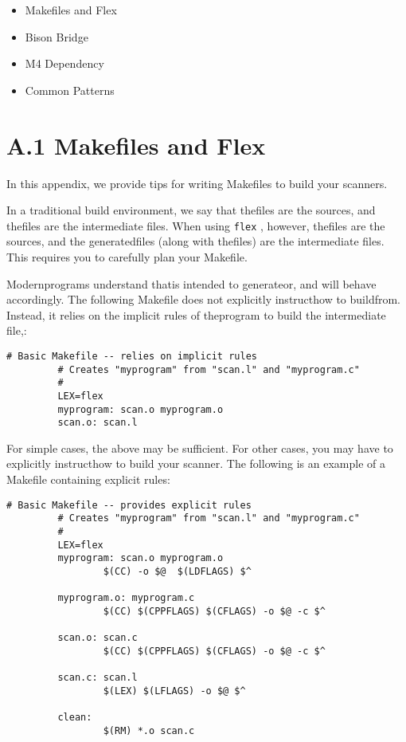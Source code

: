 \documentclass[openany,oneside]{book}
\begin{document}
\begin{itemize}
\item Makefiles and Flex
\item Bison Bridge
\item M4 Dependency
\item Common Patterns
\end{itemize}

\section{A.1 Makefiles and Flex}


In this appendix, we provide tips for writing Makefiles to build your scanners.

In a traditional build environment, we say that thefiles are the
sources, and thefiles are the intermediate files. When using \verb`flex` , however, thefiles are the sources, and the generatedfiles (along with thefiles) are the intermediate files. 
This requires you to carefully plan your Makefile.

Modernprograms understand thatis intended to
generateor, and will behave
accordingly.  The
following Makefile does not explicitly instructhow to buildfrom. Instead, it relies on the implicit rules of theprogram to build the intermediate file,:


\begin{verbatim}
# Basic Makefile -- relies on implicit rules
         # Creates "myprogram" from "scan.l" and "myprogram.c"
         #
         LEX=flex
         myprogram: scan.o myprogram.o
         scan.o: scan.l
\end{verbatim}


For simple cases, the above may be sufficient. For other cases,
you may have to explicitly instructhow to build your scanner. 
The following is an example of a Makefile containing explicit rules:


\begin{verbatim}
# Basic Makefile -- provides explicit rules
         # Creates "myprogram" from "scan.l" and "myprogram.c"
         #
         LEX=flex
         myprogram: scan.o myprogram.o
                 $(CC) -o $@  $(LDFLAGS) $^
     
         myprogram.o: myprogram.c
                 $(CC) $(CPPFLAGS) $(CFLAGS) -o $@ -c $^
     
         scan.o: scan.c
                 $(CC) $(CPPFLAGS) $(CFLAGS) -o $@ -c $^
     
         scan.c: scan.l
                 $(LEX) $(LFLAGS) -o $@ $^
     
         clean:
                 $(RM) *.o scan.c
\end{verbatim}
\end{document}
